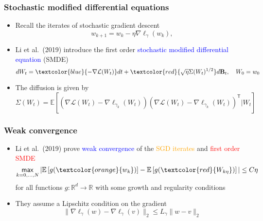 \documentclass[aspectratio=1610,10pt,ucs]{beamer} %
\newcommand{\R}{\mathbb{R}}
\renewcommand{\max}{\mathop{\mathsf{max}}}
\newcommand{\norm}[1]{\lVert{#1}\rVert_2}
\newcommand{\ev}[1]{\mathbb{E}\left[{#1}\right]}
\newcommand{\T}{\mathsf{T}}
\begin{document}
\begin{frame}
  \frametitle{Stochastic modified differential equations}
  \begin{itemize}
    \item Recall the iterates of stochastic gradient descent
    \begin{equation*}
      w_{k+1} = w_k - \eta \nabla \ell_{\gamma}(w_k),
     \end{equation*}
    \item Li et al.\ (2019) introduce the first order \textcolor{blue}{stochastic modified differential equation} (SMDE) 
    \begin{equation*}
      dW_t = \textcolor{blue}{-\nabla \mathcal{L}(W_t)}dt + \textcolor{red}{\sqrt{\eta} \Sigma(W_t)^{1/2}}d\mathbf{B}_t, \quad W_0 = w_0
    \end{equation*}
    \item The diffusion is given by
    \begin{equation*}
      \Sigma(W_t) = \ev{\left(\nabla \mathcal{L}(W_t) - \nabla \ell_{\gamma_k}(W_t)\right)\left(\nabla \mathcal{L}(W_t) - \nabla \ell_{\gamma_k}(W_t)\right)^\T |W_t}
    \end{equation*}
  \end{itemize}
\end{frame}
\begin{frame}
  \frametitle{Weak convergence}
  \begin{itemize}
    \item Li et al.\ (2019) prove \textcolor{blue}{weak convergence} of the \textcolor{orange}{SGD iterates} and \textcolor{red}{first order SMDE}
    \begin{equation*}
      \label{eq:first_order_convergence}
      \max_{k=0,\dots,N} |\ev{g(\textcolor{orange}{w_k})} - \ev{g(\textcolor{red}{W_{k\eta}})}| \leq C \eta
    \end{equation*}
    for all functions $g:\R^d \rightarrow \R$ with some growth and regularity conditions
    \item They assume a Lipschitz condition on the gradient
    \begin{equation*}
      \norm{\nabla \ell_{\gamma}(w) - \nabla \ell_{\gamma}(v)} \leq L_{\gamma} \norm{w - v}
    \end{equation*}
  \end{itemize}
\end{frame}
\end{document}
